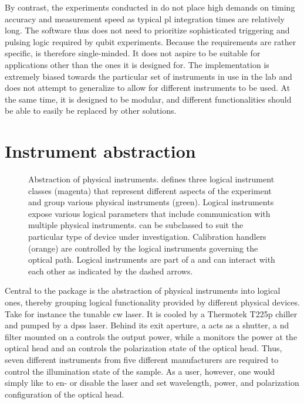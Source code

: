 By contrast, the experiments conducted in \thethesis do not place high demands on timing accuracy and measurement speed as typical \gls{pl} integration times are relatively long.
The software thus does not need to prioritize sophisticated triggering and pulsing logic required by qubit experiments.
Because the requirements are rather specific, \mjolnir is therefore single-minded.
It does not aspire to be suitable for applications other than the ones it is designed for.
The implementation is extremely biased towards the particular set of instruments in use in the lab and does not attempt to generalize to allow for different instruments to be used.
At the same time, it is designed to be modular, and different functionalities should be able to easily be replaced by other solutions.

\section{Instrument abstraction}\label{sec:exp:mjolnir:instruments}
\begin{figure}
    \centering
    
    \caption[]{
        Abstraction of physical instruments.
        \mjolnir defines three logical instrument classes (magenta) that represent different aspects of the experiment and group various physical instruments (green).
        Logical instruments expose various logical parameters that include communication with multiple physical instruments.
         can be subclassed to suit the particular type of device under investigation.
        Calibration handlers (orange) are controlled by the logical instruments governing the optical path.
        Logical instruments are part of a \qcodes {} and can interact with each other as indicated by the dashed arrows.
    }
    \label{fig:exp:mjolnir:layout}
\end{figure}

Central to the \mjolnir package is the abstraction of physical instruments into logical ones, thereby grouping logical functionality provided by different physical devices.
Take for instance the tunable \gls{cw} \tisalaser laser.
It is cooled by a Thermotek T225p chiller and pumped by a \pumplaser \gls{dpss} laser.
Behind its exit aperture, a \thorlabsflipper acts as a shutter, a \gls{nd} filter mounted on a \thorlabsrotator controls the output power, while a \thorlabspowermeter monitors the power at the optical head and an \rotatorcontroller controls the polarization state of the optical head.
Thus, seven different instruments from five different manufacturers are required to control the illumination state of the sample.
As a user, however, one would simply like to en- or disable the laser and set wavelength, power, and polarization configuration of the optical head.

